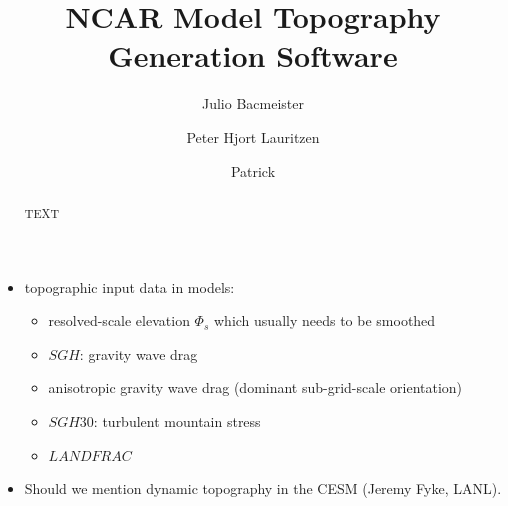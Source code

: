 \documentclass[gmd]{copernicus}
\begin{document}
\linenumbers

\title{NCAR Model Topography Generation Software}


\author[1]{Julio Bacmeister}
\author[1]{Peter Hjort Lauritzen}
\author[1]{Patrick }













\maketitle  %



\begin{abstract}
TEXT
\end{abstract}



\introduction  %
\begin{itemize}
\item topographic input data in models:
\begin{itemize}
\item resolved-scale elevation $\Phi_s$ which usually needs to be smoothed
\item $SGH$: gravity wave drag
\item anisotropic gravity wave drag (dominant sub-grid-scale orientation)
\item $SGH30$: turbulent mountain stress
\item $LANDFRAC$
\end{itemize}
\end{itemize}

\begin{itemize}
\item Should we mention dynamic topography in the CESM (Jeremy Fyke, LANL).
\end{itemize}
\end{document}
